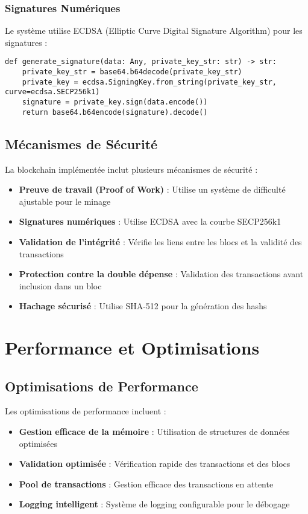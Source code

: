 \documentclass[french]{article}
\begin{document}
\subsubsection{Signatures Numériques}
Le système utilise ECDSA (Elliptic Curve Digital Signature Algorithm) pour les signatures :
\begin{lstlisting}[style=python, caption=Génération de Signature]
def generate_signature(data: Any, private_key_str: str) -> str:
    private_key_str = base64.b64decode(private_key_str)
    private_key = ecdsa.SigningKey.from_string(private_key_str, curve=ecdsa.SECP256k1)
    signature = private_key.sign(data.encode())
    return base64.b64encode(signature).decode()
\end{lstlisting}

\subsection{Mécanismes de Sécurité}
La blockchain implémentée inclut plusieurs mécanismes de sécurité :
\begin{itemize}
    \item \textbf{Preuve de travail (Proof of Work)} : Utilise un système de difficulté ajustable pour le minage
    \item \textbf{Signatures numériques} : Utilise ECDSA avec la courbe SECP256k1
    \item \textbf{Validation de l'intégrité} : Vérifie les liens entre les blocs et la validité des transactions
    \item \textbf{Protection contre la double dépense} : Validation des transactions avant inclusion dans un bloc
    \item \textbf{Hachage sécurisé} : Utilise SHA-512 pour la génération des hashs
\end{itemize}

\section{Performance et Optimisations}
\subsection{Optimisations de Performance}
Les optimisations de performance incluent :
\begin{itemize}
    \item \textbf{Gestion efficace de la mémoire} : Utilisation de structures de données optimisées
    \item \textbf{Validation optimisée} : Vérification rapide des transactions et des blocs
    \item \textbf{Pool de transactions} : Gestion efficace des transactions en attente
    \item \textbf{Logging intelligent} : Système de logging configurable pour le débogage
\end{itemize}
\end{document}
